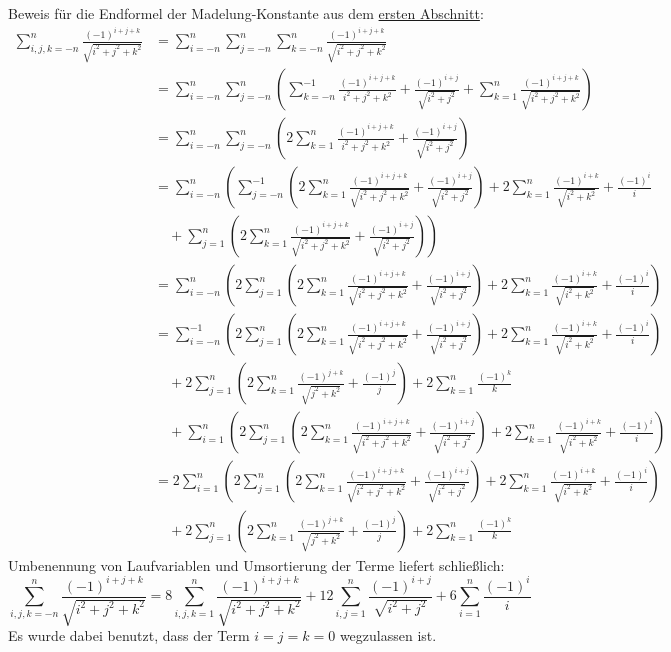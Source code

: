 \documentclass[11pt,a4paper]{article}
\begin{document}
Beweis für die Endformel der Madelung-Konstante aus dem \hyperref[sec:energie]{ersten Abschnitt}:
\begin{align*}
    \sum_{i,j,k=-n}^{n} \frac{(-1)   ^{i+j+k}}{\sqrt{i^2 + j^2 + k^2}} &= \sum_{i=-n}^{n} \sum_{j=-n}^{n} \sum_{k=-n}^{n} \frac{(-1)   ^{i+j+k}}{\sqrt{i^2 + j^2 + k^2}} \\
    &= \sum_{i=-n}^{n} \sum_{j=-n}^{n} \left(\sum_{k=-n}^{-1} \frac{(-1)^{i+j+k}}{i^2 + j^2 + k^2} + \frac{(-1)^{i+j}}{\sqrt{i^2 + j^2}} + \sum_{k=1}^{n} \frac{(-1)^{i+j+k}}{\sqrt{i^2 + j^2 + k^2}}\right) \\
    &= \sum_{i=-n}^{n} \sum_{j=-n}^{n} \left(2\sum_{k=1}^{n} \frac{(-1)^{i+j+k}}{i^2 + j^2 + k^2} + \frac{(-1)^{i+j}}{\sqrt{i^2 + j^2}}\right) \\
    &= \sum_{i=-n}^{n} \left(\sum_{j=-n}^{-1} \left(2\sum_{k=1}^{n} \frac{(-1)^{i+j+k}}{\sqrt{i^2 + j^2 + k^2}} + \frac{(-1)^{i+j}}{\sqrt{i^2 + j^2}}\right) + 2\sum_{k=1}^{n}\frac{(-1)^{i+k}}{\sqrt{i^2 + k^2}} + \frac{(-1)^{i}}{i}\right. \\
    &\left. \quad + \sum_{j=1}^{n}\left(2\sum_{k=1}^{n}\frac{(-1)^{i+j+k}}{\sqrt{i^2 + j^2 + k^2}} + \frac{(-1)^{i+j}}{\sqrt{i^2 + j^2}}\right)\right) \\
    &= \sum_{i=-n}^{n}\left(2\sum_{j=1}^{n}\left(2\sum_{k=1}^{n}\frac{(-1)^{i+j+k}}{\sqrt{i^2 + j^2 + k^2}} + \frac{(-1)^{i+j}}{\sqrt{i^2 + j^2}}\right) + 2\sum_{k=1}^{n}\frac{(-1)^{i+k}}{\sqrt{i^2 + k^2}} + \frac{(-1)^{i}}{i}\right) \\
    &= \sum_{i=-n}^{-1}\left(2\sum_{j=1}^{n}\left(2\sum_{k=1}^{n}\frac{(-1)^{i+j+k}}{\sqrt{i^2 + j^2 + k^2}} + \frac{(-1)^{i+j}}{\sqrt{i^2 + j^2}}\right) + 2\sum_{k=1}^{n}\frac{(-1)^{i+k}}{\sqrt{i^2 + k^2}} + \frac{(-1)^{i}}{i}\right) \\
    &\quad + 2\sum_{j=1}^{n}\left(2\sum_{k=1}^{n}\frac{(-1)^{j+k}}{\sqrt{j^2 + k^2}} + \frac{(-1)^{j}}{j}\right) + 2\sum_{k=1}^{n}\frac{(-1)^k}{k} \\
    &\quad + \sum_{i=1}^{n}\left(2\sum_{j=1}^{n}\left(2\sum_{k=1}^{n}\frac{(-1)^{i+j+k}}{\sqrt{i^2 + j^2 + k^2}} + \frac{(-1)^{i+j}}{\sqrt{i^2 + j^2}}\right) + 2\sum_{k=1}^{n}\frac{(-1)^{i+k}}{\sqrt{i^2 + k^2}} + \frac{(-1)^{i}}{i}\right) \\
    &= 2\sum_{i=1}^{n}\left(2\sum_{j=1}^{n}\left(2\sum_{k=1}^{n}\frac{(-1)^{i+j+k}}{\sqrt{i^2 + j^2 + k^2}} + \frac{(-1)^{i+j}}{\sqrt{i^2 + j^2}}\right) + 2\sum_{k=1}^{n}\frac{(-1)^{i+k}}{\sqrt{i^2 + k^2}} + \frac{(-1)^{i}}{i}\right) \\
    &\quad + 2\sum_{j=1}^{n}\left(2\sum_{k=1}^{n}\frac{(-1)^{j+k}}{\sqrt{j^2 + k^2}} + \frac{(-1)^{j}}{j}\right) + 2\sum_{k=1}^{n}\frac{(-1)^{k}}{k}
\end{align*} Umbenennung von Laufvariablen und Umsortierung der Terme liefert schließlich:
\begin{equation*}
    \sum_{i,j,k=-n}^{n}\frac{(-1)^{i+j+k}}{\sqrt{i^2 + j^2 + k^2}} = 8\sum_{i,j,k=1}^{n}\frac{(-1)^{i+j+k}}{\sqrt{i^2 + j^2 + k^2}} + 12\sum_{i,j=1}^{n}\frac{(-1)^{i+j}}{\sqrt{i^2 + j^2}} + 6\sum_{i=1}^{n} \frac{(-1)^{i}}{i}
\end{equation*} Es wurde dabei benutzt, dass der Term $i=j=k=0$ wegzulassen ist.\newpage

\listoffigures



\end{document}
